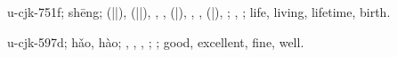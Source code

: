 \begin{multicols}{2}
{\cjkgGlue{}u-cjk-751f; shēng; \cjkgGlue{}\cjkgGlue{}(\cjkgGlue{}|\cjkgGlue{}|\cjkgGlue{}), \cjkgGlue{}\cjkgGlue{}(\cjkgGlue{}|\cjkgGlue{}|\cjkgGlue{}), \cjkgGlue{}, \cjkgGlue{}\cjkgGlue{}\cjkgGlue{}, \cjkgGlue{}\cjkgGlue{}(\cjkgGlue{}|\cjkgGlue{}), \cjkgGlue{}, \cjkgGlue{}, \cjkgGlue{}\cjkgGlue{}(\cjkgGlue{}|\cjkgGlue{}), \cjkgGlue{}\cjkgGlue{}\cjkgGlue{}; \cjkgGlue{}, \cjkgGlue{}; life, living, lifetime, birth.

\cjkgGlue{}u-cjk-597d; hǎo, hào; \cjkgGlue{}\cjkgGlue{}\cjkgGlue{}, \cjkgGlue{}\cjkgGlue{}\cjkgGlue{}, \cjkgGlue{}\cjkgGlue{}\cjkgGlue{}, \cjkgGlue{}\cjkgGlue{}\cjkgGlue{}; \cjkgGlue{}; good, excellent, fine, well.

}
\end{multicols}
